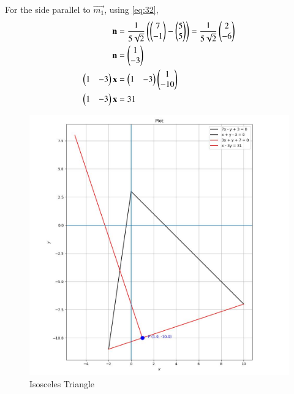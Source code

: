 \documentclass[journal]{IEEEtran}
\begin{document}
For the side parallel to $\vec{m_1}$, using \eqref{eq:32},
\begin{align}    
    \mathbf{n} &= \frac{1}{5\sqrt{2}}\left(\begin{pmatrix}7 \\ -1\end{pmatrix} - \begin{pmatrix}5 \\ 5\end{pmatrix}\right) = \frac{1}{5\sqrt{2}}\begin{pmatrix}2 \\ -6\end{pmatrix} \\
    \mathbf{n} &= \begin{pmatrix}1 \\ -3\end{pmatrix} \\
	\begin{pmatrix}1 & -3\end{pmatrix}\mathbf{x} &= \begin{pmatrix}1 & -3\end{pmatrix}\begin{pmatrix}1 \\ -10\end{pmatrix} \\
    \begin{pmatrix}1 & -3\end{pmatrix}\mathbf{x} &= 31
\end{align}

\begin{figure}[h!]
	\centering
	\includegraphics[width=0.6\columnwidth]{figs/plot_c.jpg}
	\caption*{Isosceles Triangle}
	\label{fig:fig}
\end{figure}
\end{document}
